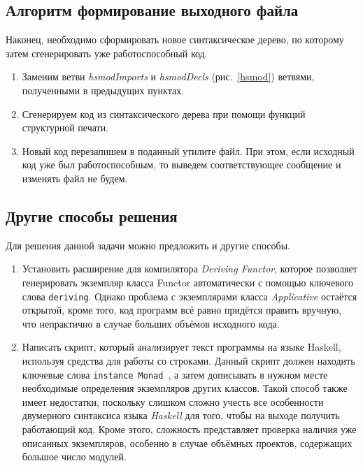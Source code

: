 \subsection{Алгоритм формирование выходного файла}
Наконец, необходимо сформировать новое синтаксическое дерево, по которому затем сгенерировать уже работоспособный код.
\begin{enumerate}[1.]
    \item Заменим ветви \textit{hsmodImports} и \textit{hsmodDecls} (рис.~\ref{hsmod}) ветвями, полученными в предыдущих пунктах.
    \item Сгенерируем код из синтаксического дерева при помощи функций структурной печати.
    \item Новый код перезапишем в поданный утилите файл. При этом, если исходный код уже был работоспособным, то выведем соответствующее сообщение и изменять файл не будем.
\end{enumerate}

\subsection{Другие способы решения}
Для решения данной задачи можно предложить и другие способы.
\begin{enumerate}
\item Установить расширение для компилятора \textit{Deriving Functor}, которое позволяет генерировать экземпляр класса Functor автоматически с помощью ключевого слова \lstinline{deriving}. Однако проблема с экземплярами класса \textit{Applicative} остаётся открытой, кроме того, код программ всё равно придётся править вручную, что непрактично в случае больших объёмов исходного кода. 
\item Написать скрипт, который анализирует текст программы на языке Haskell, используя средства для работы со строками. Данный скрипт должен находить ключевые слова \lstinline{instance Monad}~, а затем дописывать в нужном месте необходимые определения экземпляров других классов. Такой способ также имеет недостатки, поскольку слишком сложно учесть все особенности двумерного синтаксиса языка \textit{Haskell} для того, чтобы на выходе получить работающий код. Кроме этого, сложность представляет проверка наличия уже описанных экземпляров, особенно в случае объёмных проектов, содержащих большое число модулей.
\end{enumerate}

